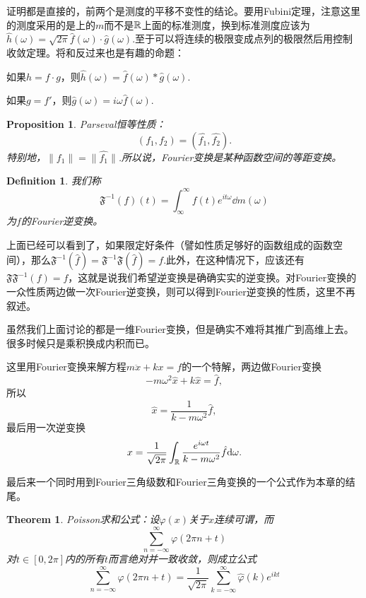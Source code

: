 \documentclass[10pt]{book}
\theoremstyle{plain}%
\newtheorem{pro}{Proposition}[chapter]%
\newtheorem{defi}{Definition}[chapter]%
\newtheorem{theo}{Theorem}[chapter]%
\begin{document}
证明都是直接的，前两个是测度的平移不变性的结论。要用Fubini定理，注意这里的测度采用的是上的$m$而不是$\mathbb{R}$上面的标准测度，换到标准测度应该为$\hat{h}(\omega)=\sqrt{2\pi}\hat{f}(\omega)\cdot\hat{g}(\omega)$.至于可以将连续的极限变成点列的极限然后用控制收敛定理。将和反过来也是有趣的命题：

 如果$h=f\cdot g$，则$\hat{h}(\omega)=\hat{f}(\omega)*\hat{g}(\omega)$.

 如果$g=f'$，则$\hat{g}(\omega)=i\omega\hat{f}(\omega)$.

\begin{pro}
Parseval恒等性质：
\[
	(f_1,f_2)=(\hat{f_1},\hat{f_2}).
\]
特别地，$\|f_1\|=\|\hat{f_1}\|$.所以说，Fourier变换是某种函数空间的等距变换。
\end{pro}

\begin{defi}
我们称
\[
\mathfrak{F}^{-1}(f)(t)=\int_{\infty}^\infty f(t)e^{it \omega}\dd m(\omega)
\]
为$f$的Fourier逆变换。
\end{defi}

上面已经可以看到了，如果限定好条件（譬如性质足够好的函数组成的函数空间），那么$\mathfrak{F}^{-1}(\hat{f})=\mathfrak{F}^{-1}\mathfrak{F}(\hat{f})=f$.此外，在这种情况下，应该还有$\mathfrak{F}\mathfrak{F}^{-1}(f)=f$，这就是说我们希望逆变换是确确实实的逆变换。对Fourier变换的一众性质两边做一次Fourier逆变换，则可以得到Fourier逆变换的性质，这里不再叙述。

虽然我们上面讨论的都是一维Fourier变换，但是确实不难将其推广到高维上去。很多时候只是乘积换成内积而已。

这里用Fourier变换来解方程$m\ddot{x}+kx=f$的一个特解，两边做Fourier变换
\[
	-m\omega^2 \hat{x}+k\hat{x}=\hat{f},
\]
所以
\[
	\hat{x}=\frac{1}{k-m\omega^2}\hat{f},
\]
最后用一次逆变换
\[
	x=\frac{1}{\sqrt{2\pi}}\int_{\mathbb{R}} \frac{e^{i\omega t}}{k-m\omega^2}\hat{f}\mathrm{d} \omega.
\]

最后来一个同时用到Fourier三角级数和Fourier三角变换的一个公式作为本章的结尾。
\begin{theo}
Poisson求和公式：设$\varphi(x)$关于$x$连续可谓，而
\[
\sum_{n=-\infty}^\infty \varphi(2\pi n+t)
\]
对$t\in[0,2\pi]$内的所有$t$而言绝对并一致收敛，则成立公式
\[
\sum_{n=-\infty}^\infty \varphi(2\pi n+t)=\frac{1}{\sqrt{2\pi}}\sum_{k=-\infty}^\infty \hat{\varphi}(k)e^{ikt}
\]
\end{theo}

\end{document}
